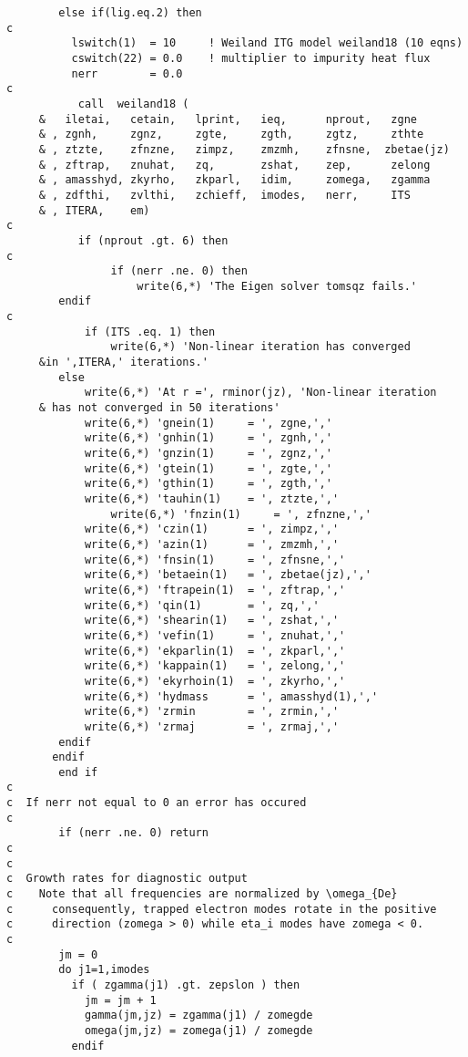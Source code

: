 \begin{verbatim}
        else if(lig.eq.2) then
c
          lswitch(1)  = 10     ! Weiland ITG model weiland18 (10 eqns)
          cswitch(22) = 0.0    ! multiplier to impurity heat flux
          nerr        = 0.0
c
           call  weiland18 (
     &   iletai,   cetain,   lprint,   ieq,      nprout,   zgne
     & , zgnh,     zgnz,     zgte,     zgth,     zgtz,     zthte
     & , ztzte,    zfnzne,   zimpz,    zmzmh,    zfnsne,  zbetae(jz)
     & , zftrap,   znuhat,   zq,       zshat,    zep,      zelong
     & , amasshyd, zkyrho,   zkparl,   idim,     zomega,   zgamma
     & , zdfthi,   zvlthi,   zchieff,  imodes,   nerr,     ITS
     & , ITERA,    em)
c      
           if (nprout .gt. 6) then
c
                if (nerr .ne. 0) then
                	write(6,*) 'The Eigen solver tomsqz fails.'
  		endif
c		
           	if (ITS .eq. 1) then
      			write(6,*) 'Non-linear iteration has converged 
     &in ',ITERA,' iterations.'
  	   	else
			write(6,*) 'At r =', rminor(jz), 'Non-linear iteration 
     & has not converged in 50 iterations'
			write(6,*) 'gnein(1)     = ', zgne,','     
 			write(6,*) 'gnhin(1)     = ', zgnh,','     
 			write(6,*) 'gnzin(1)     = ', zgnz,','     
			write(6,*) 'gtein(1)     = ', zgte,','     
			write(6,*) 'gthin(1)     = ', zgth,',' 
  			write(6,*) 'tauhin(1)    = ', ztzte,','  
     			write(6,*) 'fnzin(1)     = ', zfnzne,','  
			write(6,*) 'czin(1)      = ', zimpz,','    
			write(6,*) 'azin(1)      = ', zmzmh,',' 
			write(6,*) 'fnsin(1)     = ', zfnsne,','  
			write(6,*) 'betaein(1)   = ', zbetae(jz),',' 	
 			write(6,*) 'ftrapein(1)  = ', zftrap,','      
			write(6,*) 'qin(1)       = ', zq,','       
			write(6,*) 'shearin(1)   = ', zshat,','     
			write(6,*) 'vefin(1)     = ', znuhat,','    
 			write(6,*) 'ekparlin(1)  = ', zkparl,','   
			write(6,*) 'kappain(1)   = ', zelong,',' 
			write(6,*) 'ekyrhoin(1)  = ', zkyrho,',' 
			write(6,*) 'hydmass      = ', amasshyd(1),',' 
			write(6,*) 'zrmin        = ', zrmin,',' 
			write(6,*) 'zrmaj        = ', zrmaj,',' 
  	   	endif
	   endif
        end if
c
c  If nerr not equal to 0 an error has occured
c
        if (nerr .ne. 0) return
c
c
c  Growth rates for diagnostic output
c    Note that all frequencies are normalized by \omega_{De}
c      consequently, trapped electron modes rotate in the positive
c      direction (zomega > 0) while eta_i modes have zomega < 0.
c
        jm = 0
        do j1=1,imodes
          if ( zgamma(j1) .gt. zepslon ) then
            jm = jm + 1
            gamma(jm,jz) = zgamma(j1) / zomegde
            omega(jm,jz) = zomega(j1) / zomegde
          endif

\end{verbatim}
